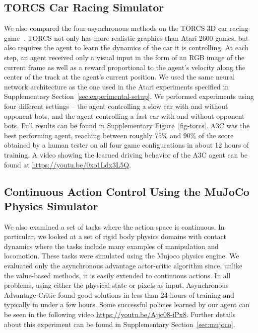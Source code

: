 \documentclass{article} \usepackage{times}
\begin{document}
\subsection{TORCS Car Racing Simulator}





We also compared the four asynchronous methods on the TORCS 3D car racing game~\citep{wymann-torcs}.
TORCS not only has more realistic graphics than Atari 2600 games, but also requires the agent to learn the dynamics of the car it is controlling.
At each step, an agent received only a visual input in the form of an RGB image of the current frame as well as a reward proportional to the agent's velocity along the center of the track at the agent's current position.
We used the same neural network architecture as the one used in the Atari experiments specified in Supplementary Section~\ref{sec:experimental-setup}.
We performed experiments using four different settings -- the agent controlling a slow car with and without opponent bots, and the agent controlling a fast car with and without opponent bots.
Full results can be found in Supplementary Figure~\ref{fig-torcs}.
A3C was the best performing agent, reaching between roughly $75\%$ and $90\%$ of the score obtained by a human tester on all four game configurations in about 12 hours of training.
A video showing the learned driving behavior of the A3C agent can be found at \url{https://youtu.be/0xo1Ldx3L5Q}.




\subsection{Continuous Action Control Using the MuJoCo Physics Simulator}
We also examined a set of tasks where the action space is continuous.
In particular, we looked at a set of rigid body physics domains with contact dynamics
where the tasks include many examples of manipulation and locomotion.
These tasks were simulated using the Mujoco physics engine.
We evaluated only the asynchronous advantage actor-critic algorithm since, unlike the value-based methods, it is easily extended to continuous actions.
In all problems, using either the physical state or pixels as input, Asynchronous Advantage-Critic found good solutions in less than 24 hours of training and typically in under a few hours.
Some successful policies learned by our agent can be seen in the following video \url{https://youtu.be/Ajjc08-iPx8}.
Further details about this experiment can be found in Supplementary Section~\ref{sec:mujoco}.
\end{document}
